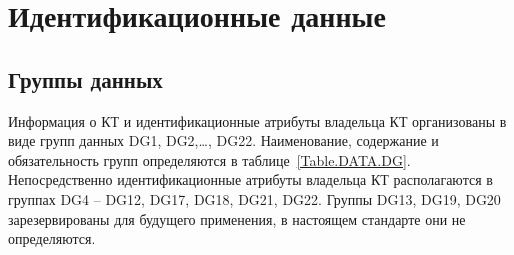 \chapter{Идентификационные данные}\label{DATA}

\section{Группы данных}\label{DATA.DG}

Информация о КТ и идентификационные атрибуты владельца КТ организованы в 
виде групп данных DG1, DG2,\ldots, DG22. Наименование, содержание и 
обязательность групп определяются в таблице~\ref{Table.DATA.DG}. 
%
Непосредственно идентификационные атрибуты владельца КТ располагаются 
в группах DG4 -- DG12, DG17, DG18, DG21, DG22. 
Группы DG13, DG19, DG20 зарезервированы для будущего 
применения, в настоящем стандарте они не определяются. 

